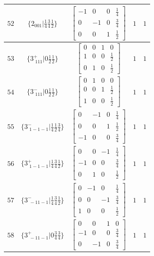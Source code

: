 \documentclass[fleqn,8pt]{jsarticle}
\begin{document}
\begin{longtable}{ccccc}
$ 52 $ & $ \{2{}_{001}|\frac{1}{4} \frac{3}{4} \frac{1}{2}\} $ & $ \begin{bmatrix} -1 & 0 & 0 & \frac{1}{4} \\ 0 & -1 & 0 & \frac{3}{4} \\ 0 & 0 & 1 & \frac{1}{2} \end{bmatrix} $ & $ 1 $ & $ 1 $ \\ \hline
$ 53 $ & $ \{3^{+}_{\,\,111}|0 \frac{1}{2} \frac{1}{2}\} $ & $ \begin{bmatrix} 0 & 0 & 1 & 0 \\ 1 & 0 & 0 & \frac{1}{2} \\ 0 & 1 & 0 & \frac{1}{2} \end{bmatrix} $ & $ 1 $ & $ 1 $ \\ \hline
$ 54 $ & $ \{3^{-}_{\,\,111}|0 \frac{1}{2} \frac{1}{2}\} $ & $ \begin{bmatrix} 0 & 1 & 0 & 0 \\ 0 & 0 & 1 & \frac{1}{2} \\ 1 & 0 & 0 & \frac{1}{2} \end{bmatrix} $ & $ 1 $ & $ 1 $ \\ \hline
$ 55 $ & $ \{3^{-}_{\,\,1-1-1}|\frac{1}{4} \frac{1}{2} \frac{3}{4}\} $ & $ \begin{bmatrix} 0 & -1 & 0 & \frac{1}{4} \\ 0 & 0 & 1 & \frac{1}{2} \\ -1 & 0 & 0 & \frac{3}{4} \end{bmatrix} $ & $ 1 $ & $ 1 $ \\ \hline
$ 56 $ & $ \{3^{+}_{\,\,1-1-1}|\frac{1}{4} \frac{3}{4} \frac{1}{2}\} $ & $ \begin{bmatrix} 0 & 0 & -1 & \frac{1}{4} \\ -1 & 0 & 0 & \frac{3}{4} \\ 0 & 1 & 0 & \frac{1}{2} \end{bmatrix} $ & $ 1 $ & $ 1 $ \\ \hline
$ 57 $ & $ \{3^{-}_{\,\,-11-1}|\frac{1}{4} \frac{3}{4} \frac{1}{2}\} $ & $ \begin{bmatrix} 0 & -1 & 0 & \frac{1}{4} \\ 0 & 0 & -1 & \frac{3}{4} \\ 1 & 0 & 0 & \frac{1}{2} \end{bmatrix} $ & $ 1 $ & $ 1 $ \\ \hline
$ 58 $ & $ \{3^{+}_{\,\,-11-1}|0 \frac{3}{4} \frac{3}{4}\} $ & $ \begin{bmatrix} 0 & 0 & 1 & 0 \\ -1 & 0 & 0 & \frac{3}{4} \\ 0 & -1 & 0 & \frac{3}{4} \end{bmatrix} $ & $ 1 $ & $ 1 $ \\ \hline

\end{longtable}
\end{document}
